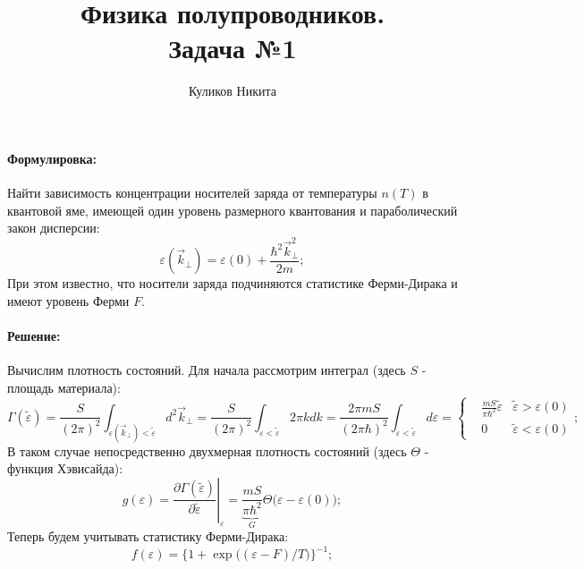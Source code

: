 \documentclass[a4paper, 14pt, russian]{article}
\title{Физика полупроводников.\\
        Задача №1}
\author{Куликов Никита}
\date{}
\newcommand{\pa}{\partial}
\newcommand{\vep}{\varepsilon}
\begin{document}
    \maketitle

    \paragraph{Формулировка:} Найти зависимость концентрации
        носителей заряда от температуры $n(T)$ в квантовой яме, имеющей 
        один уровень размерного квантования и параболический закон
        дисперсии:
        \begin{equation}
            \vep(\vec{k}_\perp) = \vep(0) + \frac{\hbar^2 \vec{k}_\perp^2}{2m};
        \end{equation}
        При этом известно, что носители заряда подчиняются статистике
        Ферми-Дирака и имеют уровень Ферми $F$.

    \paragraph{Решение:} Вычислим плотность состояний. Для начала рассмотрим
        интеграл (здесь $S$ - площадь материала):
        \begin{equation}
            \Gamma (\tilde \vep) = \frac{S}{(2 \pi)^2} \int_{\vep(\vec{k}_\perp) < \tilde \vep} 
                d^2 \vec{k}_\perp = \frac{S}{(2 \pi)^2}
                \int_{\vep < \tilde \vep} 2 \pi k dk = 
                \frac{2 \pi m S}{(2 \pi \hbar)^2} \int_{\vep < \tilde \vep} 
                d\vep = 
                \left\{\begin{aligned}
                    &  \frac{m S}{\pi \hbar^2} \tilde \vep & \tilde \vep > \vep(0)\\
                    &  0                                 & \tilde \vep < \vep(0)
                \end{aligned}\right.;
        \end{equation}
        В таком случае непосредственно двухмерная плотность состояний (здесь $\Theta$ - функция Хэвисайда):
        \begin{equation}
            g(\vep) = \left. \frac{\pa \Gamma(\tilde \vep)}{\pa \tilde \vep} \right\rvert_{\vep}
                = \underbrace{\frac{mS}{\pi \hbar^2}}_{G} \Theta\big(\vep - \vep(0)\big); 
        \end{equation}
        Теперь будем учитывать статистику Ферми-Дирака:
        \begin{equation}
            f(\vep) = \Big\{1 + \exp\big((\vep - F) / T\big)\Big\}^{-1};
        \end{equation}
\end{document}
